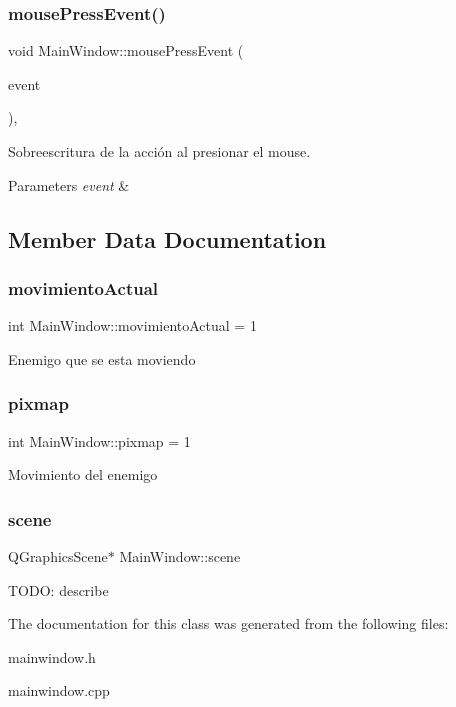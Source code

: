 \subsubsection{\texorpdfstring{mouse\+Press\+Event()}{mousePressEvent()}}
{\footnotesize\ttfamily void Main\+Window\+::mouse\+Press\+Event (\begin{DoxyParamCaption}\item[{Q\+Mouse\+Event $\ast$}]{event }\end{DoxyParamCaption})\hspace{0.3cm}{\ttfamily [override]}, {\ttfamily [protected]}}



Sobreescritura de la acción al presionar el mouse. 


\begin{DoxyParams}{Parameters}
{\em event} & \\
\hline
\end{DoxyParams}


\subsection{Member Data Documentation}
\mbox{\label{classMainWindow_ade7c819849bfce458b66795a473697e5}} 
\subsubsection{\texorpdfstring{movimiento\+Actual}{movimientoActual}}
{\footnotesize\ttfamily int Main\+Window\+::movimiento\+Actual = 1}

Enemigo que se esta moviendo \mbox{\label{classMainWindow_a1c3bc1ef6b18ff768eaebb009fa9957d}} 
\subsubsection{\texorpdfstring{pixmap}{pixmap}}
{\footnotesize\ttfamily int Main\+Window\+::pixmap = 1}

Movimiento del enemigo \mbox{\label{classMainWindow_a51ac2b126495216832501cea3929c6f6}} 
\subsubsection{\texorpdfstring{scene}{scene}}
{\footnotesize\ttfamily Q\+Graphics\+Scene$\ast$ Main\+Window\+::scene}

T\+O\+DO\+: describe 

The documentation for this class was generated from the following files\+:\begin{DoxyCompactItemize}
\item 
mainwindow.\+h\item 
mainwindow.\+cpp\end{DoxyCompactItemize}
